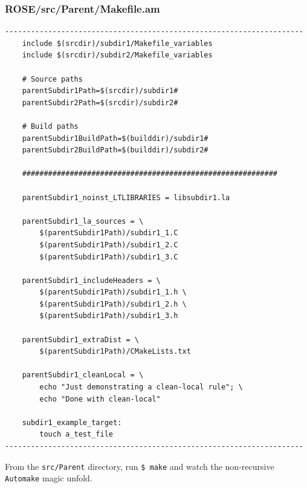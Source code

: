 \subsubsection{ROSE/src/Parent/Makefile.am}
    \begin{verbatim}
---------------------------------------------------------------------
    include $(srcdir)/subdir1/Makefile_variables
    include $(srcdir)/subdir2/Makefile_variables

    # Source paths
    parentSubdir1Path=$(srcdir)/subdir1#
    parentSubdir2Path=$(srcdir)/subdir2#

    # Build paths
    parentSubdir1BuildPath=$(builddir)/subdir1#
    parentSubdir2BuildPath=$(builddir)/subdir2#

    ###########################################################   

    parentSubdir1_noinst_LTLIBRARIES = libsubdir1.la

    parentSubdir1_la_sources = \
        $(parentSubdir1Path)/subdir1_1.C
        $(parentSubdir1Path)/subdir1_2.C
        $(parentSubdir1Path)/subdir1_3.C 

    parentSubdir1_includeHeaders = \
        $(parentSubdir1Path)/subdir1_1.h \
        $(parentSubdir1Path)/subdir1_2.h \
        $(parentSubdir1Path)/subdir1_3.h

    parentSubdir1_extraDist = \
        $(parentSubdir1Path)/CMakeLists.txt

    parentSubdir1_cleanLocal = \
        echo "Just demonstrating a clean-local rule"; \
        echo "Done with clean-local"

    subdir1_example_target:
        touch a_test_file
---------------------------------------------------------------------
    \end{verbatim}
From the \texttt{src/Parent} directory, run \texttt{\$ make} and watch the non-recursive
\texttt{Automake} magic unfold.
